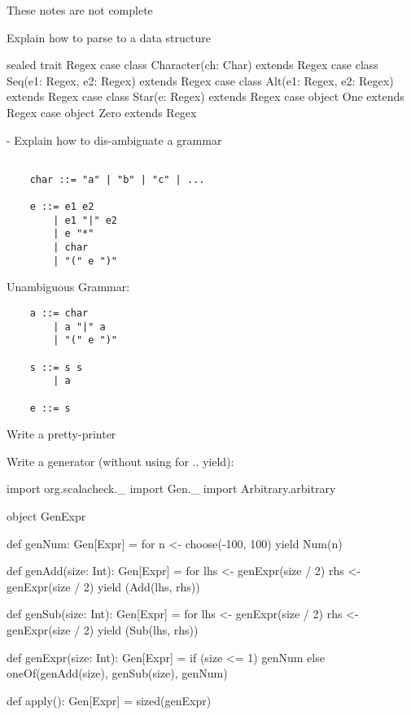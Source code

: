 \newlecture

\begin{instructor}
These notes are not complete
\end{instructor}


Explain how to parse to a data structure

\begin{scalacode}
  sealed trait Regex
  case class Character(ch: Char) extends Regex
  case class Seq(e1: Regex, e2: Regex) extends Regex
  case class Alt(e1: Regex, e2: Regex) extends Regex
  case class Star(e: Regex) extends Regex
  case object One extends Regex
  case object Zero extends Regex
\end{scalacode}

- Explain how to dis-ambiguate a grammar

\begin{verbatim}

    char ::= "a" | "b" | "c" | ...

    e ::= e1 e2
        | e1 "|" e2
        | e "*"
        | char
        | "(" e ")"
\end{verbatim}

Unambiguous Grammar:

\begin{verbatim}
    a ::= char
        | a "|" a
        | "(" e ")"

    s ::= s s
        | a

    e ::= s
\end{verbatim}

Write a pretty-printer


Write a generator (without using for .. yield):

\begin{scalacode}
  import org.scalacheck._
  import Gen._
  import Arbitrary.arbitrary

  object GenExpr {

    def genNum: Gen[Expr] = for {
      n <- choose(-100, 100)
    } yield Num(n)

    def genAdd(size: Int): Gen[Expr] = for {
      lhs <- genExpr(size / 2)
      rhs <- genExpr(size / 2)
    } yield (Add(lhs, rhs))

    def genSub(size: Int): Gen[Expr] = for {
      lhs <- genExpr(size / 2)
      rhs <- genExpr(size / 2)
    } yield (Sub(lhs, rhs))

    def genExpr(size: Int): Gen[Expr] = {
      if (size <= 1) {
        genNum
      }
      else {
        oneOf(genAdd(size), genSub(size), genNum)
      }
    }

    def apply(): Gen[Expr] = sized(genExpr)

  }
\end{scalacode}